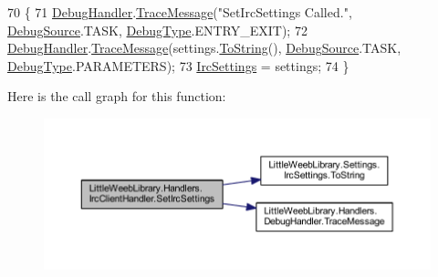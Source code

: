 \begin{DoxyCode}
70         \{
71             \mbox{\hyperlink{class_little_weeb_library_1_1_handlers_1_1_irc_client_handler_ab50ece494948d25db1839f4d6eab038f}{DebugHandler}}.\mbox{\hyperlink{interface_little_weeb_library_1_1_handlers_1_1_i_debug_handler_a2e405bc3492e683cd3702fae125221bc}{TraceMessage}}(\textcolor{stringliteral}{"SetIrcSettings Called."}, 
      \mbox{\hyperlink{namespace_little_weeb_library_1_1_handlers_a2a6ca0775121c9c503d58aa254d292be}{DebugSource}}.TASK, \mbox{\hyperlink{namespace_little_weeb_library_1_1_handlers_ab66019ed40462876ec4e61bb3ccb0a62}{DebugType}}.ENTRY\_EXIT);
72             \mbox{\hyperlink{class_little_weeb_library_1_1_handlers_1_1_irc_client_handler_ab50ece494948d25db1839f4d6eab038f}{DebugHandler}}.\mbox{\hyperlink{interface_little_weeb_library_1_1_handlers_1_1_i_debug_handler_a2e405bc3492e683cd3702fae125221bc}{TraceMessage}}(settings.\mbox{\hyperlink{class_little_weeb_library_1_1_settings_1_1_irc_settings_a2e1d7f26d7d3083d19c3a9e6c6c2d0b2}{ToString}}(), 
      \mbox{\hyperlink{namespace_little_weeb_library_1_1_handlers_a2a6ca0775121c9c503d58aa254d292be}{DebugSource}}.TASK, \mbox{\hyperlink{namespace_little_weeb_library_1_1_handlers_ab66019ed40462876ec4e61bb3ccb0a62}{DebugType}}.PARAMETERS);
73             \mbox{\hyperlink{class_little_weeb_library_1_1_settings_1_1_irc_settings}{IrcSettings}} = settings;
74         \}
\end{DoxyCode}
Here is the call graph for this function\+:\nopagebreak
\begin{figure}[H]
\begin{center}
\leavevmode
\includegraphics[width=350pt]{class_little_weeb_library_1_1_handlers_1_1_irc_client_handler_a510c909225e51c66b65f7114ebd356d3_cgraph}
\end{center}
\end{figure}
\mbox{\label{class_little_weeb_library_1_1_handlers_1_1_irc_client_handler_ae0b7e9fc2b6c7874a6be2a938f88fc1a}} 
